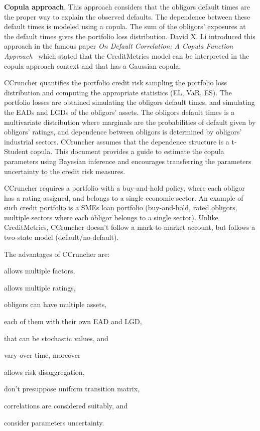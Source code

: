 \documentclass[11pt,fleqn]{book} %
\begin{document}
\textbf{Copula approach}. This approach considers that the obligors default 
times are the proper way to explain the observed defaults. The dependence 
between these default times is modeled using a copula. The sum of the 
obligors' exposures at the default times gives the portfolio loss distribution.
David X. Li introduced this approach in the famous paper
\emph{On Default Correlation: A Copula Function Approach}~\cite{li:2000}
which stated that the CreditMetrics\texttrademark{} model can be interpreted 
in the copula approach context and that has a Gaussian copula.

CCruncher quantifies the portfolio credit risk sampling the portfolio loss
distribution and computing the appropriate statistics (EL, VaR, ES). The 
portfolio losses are obtained simulating the obligors default times, 
and simulating the EADs and LGDs of the obligors' assets. The obligors 
default times is a multivariate distribution where marginals are the 
probabilities of default given by obligors' ratings, and dependence between 
obligors is determined by obligors' industrial sectors.
CCruncher assumes that the dependence structure is a t-Student copula.
This document provides a guide to estimate the copula parameters using
Bayesian inference and encourages transferring the parameters uncertainty
to the credit risk measures.

CCruncher requires a portfolio with a buy-and-hold policy, where each obligor 
has a rating assigned, and belongs to a single economic sector.
An example of such credit portfolio is a SMEs loan portfolio (buy-and-hold, 
rated obligors, multiple sectors where each obligor belongs to a single sector). 
Unlike CreditMetrics\texttrademark{}, CCruncher doesn't follow a mark-to-market 
account, but follows a two-state model (default/no-default). 

The advantages of CCruncher are: 
\begin{inparaenum}[1)]
	\item allows multiple factors,
	\item allows multiple ratings,
	\item obligors can have multiple assets,
	\item each of them with their own EAD and LGD,
	\item that can be stochastic values, and
	\item vary over time, moreover
	\item allows risk disaggregation,
	\item don't presuppose uniform transition matrix,
	\item correlations are considered suitably, and
	\item consider parameters uncertainty.
\end{inparaenum}
\end{document}
